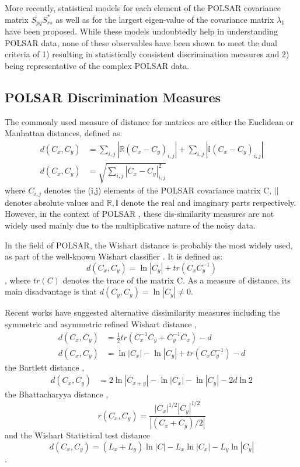 \documentclass[journal]{IEEEtran}
\begin{document}
More recently, statistical models for
  each element of the POLSAR covariance matrix $S_{pq}S_{rs}^*$ \cite{Lopez-Martinez_2003_TGRS_2232}
  as well as for the largest eigen-value of the covariance matrix $\lambda_1$ \cite{Erten_2012_Sensors_2766} have been proposed.
While these models undoubtedly help in understanding POLSAR data,
  none of these observables have been shown to meet the dual criteria of
  1) resulting in statistically consistent discrimination measures and
  2) being representative of the complex POLSAR data.

\subsection{POLSAR Discrimination Measures}
\label{sec:lit_measures}

The commonly used measure of distance for matrices are either the Euclidean or Manhattan distances, defined as:
\begin{align}
  d(C_x,C_y) &= \sum_{i,j} |\mathbb{R} (C_x - C_y)_{i,j}| + \sum_{i,j} |\mathbb{I} (C_x - C_y)_{i,j}| \\
  d(C_x,C_y) &= \sqrt{\sum_{i,j} |C_x - C_y|_{i,j}^2 }
\end{align}
where $C_{i,j}$ denotes the (i,j) elements of the POLSAR covariance matrix C,
 $||$ denotes absolute values
and $\mathbb{R},\mathbb{I}$ denote the real and imaginary parts respectively.
However, in the context of POLSAR%
, these dis-similarity measures are not widely used 
  mainly due to the multiplicative nature of the noisy data.

In the field of POLSAR, the Wishart distance is probably the most widely used, as part of the well-known Wishart classifier \cite{Lee_1999_TGRS}.
It is defined \cite{Lee_1994_IJRS_2299} as:
\begin{equation}
  d(C_x,C_y) = \ln|C_y| + tr(C_xC_y^{-1})
\end{equation},
where $tr(C)$ denotes the trace of the matrix C. 
As a measure of distance, its main disadvantage is that $d(C_y,C_y) = \ln|C_y| \neq 0$.

Recent works have suggested alternative dissimilarity measures including the symmetric and asymmetric refined Wishart distance \cite{Anfinsen_2007_ESA_POLINSAR},
\begin{align}
  d(C_x,C_y) &= \frac{1}{2} tr(C_x^{-1}C_y + C_y^{-1}C_x) - d \\
    d(C_x,C_y) &= \ln|C_x| - \ln|C_y| + tr(C_xC_y^{-1}) - d
\end{align}
the Bartlett distance \cite{Kersten_2005_TGRS_519},
  \begin{align}
  d(C_x,C_y) &= 2 \ln |C_{x+y}| - \ln |C_x| - \ln |C_y| - 2d\ln2
  \end{align}
the Bhattacharyya distance \cite{Lee_2011_IGARSS_3740},
\begin{equation}
  r(C_x,C_y) = \frac{|C_x|^{1/2} |C_y|^{1/2}}{|(C_x+C_y)/2|}
\end{equation}
and the Wishart Statistical test distance \cite{Cao_2007_TGRS_3454}
\begin{equation}
  d(C_x,C_y) = (L_x + L_y) \ln|C| - L_x \ln|C_x| - L_y\ln|C_y|
\end{equation}
.
\end{document}
